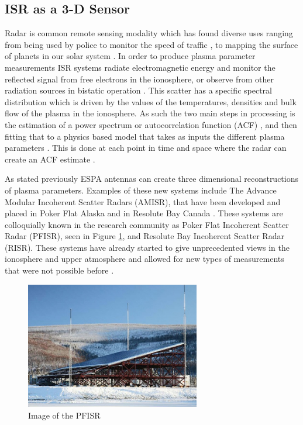 \subsection{ISR as a 3-D Sensor}
Radar is common remote sensing modality which has found diverse uses ranging from being used by police to monitor the speed of traffic \cite{richards2010principles}, to mapping the surface of planets in our solar system \cite{campbell2002radar}. In order to produce plasma parameter measurements ISR systems radiate electromagnetic energy and monitor the reflected signal from free electrons in the ionosphere, or observe from other radiation sources in bistatic operation \cite{RDS:RDS2903}. This scatter has a specific spectral distribution which is driven by the values of the temperatures, densities and bulk flow of the plasma in the ionosphere\cite{dougherty:farley1960,farleydougherty:ISR2,doughteryfarley:ISR3,hagfors1961}. As such the two main steps in processing is the estimation of a power spectrum or autocorrelation function (ACF) \cite{farley1969}, and then fitting that to a physics based model that takes as inputs the different plasma parameters \cite{RDS:RDS1387}. This is done at each point in time and space where the radar can create an ACF estimate \cite{nikoukar2008}. 

As stated previously ESPA antennas can create three dimensional reconstructions of plasma parameters. Examples of these new systems include The Advance Modular Incoherent Scatter Radars (AMISR), that have been developed and placed in Poker Flat Alaska and in Resolute Bay Canada \cite{Semeter2009738}. These systems are colloquially known in the research community as Poker Flat Incoherent Scatter Radar (PFISR), seen in Figure \ref{fig:amisrpic}, and Resolute Bay Incoherent Scatter Radar (RISR). These systems have already started to give unprecedented views in the ionosphere and upper atmosphere and allowed for new types of measurements that were not possible before \cite{semeter2010CI,butler:imagingfregiondrifts,Nicolls:2007ie}. %

\begin{figure}[!t]
\centering
\includegraphics[width=3in]{amisrimage}
\caption{Image of the PFISR \cite{SRIpage}}
\label{fig:amisrpic}
\end{figure}

